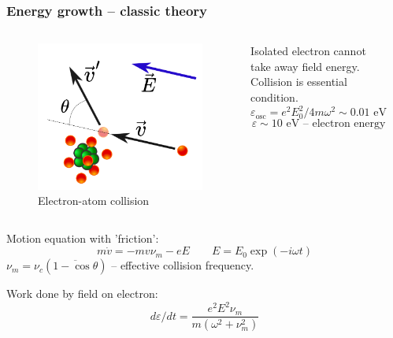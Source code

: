 \documentclass{beamer}
\begin{document}
	\begin{frame}
		\frametitle{Energy growth -- classic theory}
		
		
		
		\begin{columns}
			\begin{figure}
				\centering
				\includegraphics[width=0.8\linewidth]{res/collision.png}
				\caption*{Electron-atom collision}
			\end{figure}
			
			Isolated electron cannot take away field energy. Collision is essential condition.
			$$ \varepsilon_{\text{osc}} = e^2 E_0^2/4m\omega^2 \sim 0.01 \text{ eV}$$
			$$ \varepsilon \sim 10 \text{ eV} \text{ -- electron energy}$$
			\begin{center}
			\end{center}
		\end{columns}
		
		Motion equation with 'friction':
		$$ m \dot{v} = - m v \nu_m - e E \qquad E = E_0 \exp(-i \omega t)$$
		$\nu_m = \nu_c (\overline{1 - \cos \theta})$ -- effective collision frequency.
		
		Work done by field on electron:
		\begin{equation}
			\boxed{d\varepsilon/dt = \frac{e^2 E^2 \nu_m}{m (\omega^2 + \nu_m^2)}
				\label{eq:energy_growth}}
		\end{equation}
		

\end{frame}
\end{document}
